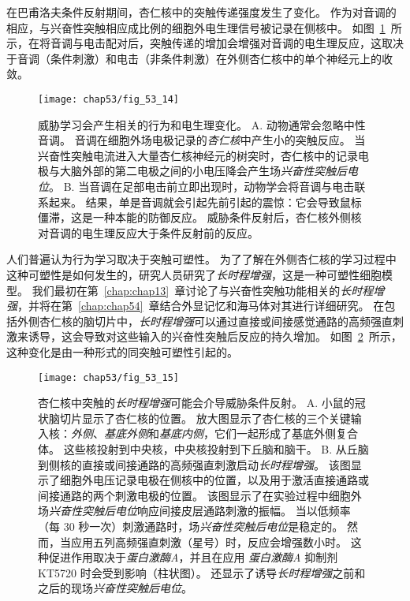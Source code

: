 在巴甫洛夫条件反射期间，杏仁核中的突触传递强度发生了变化。
作为对音调的相应，与兴奋性突触相应成比例的细胞外电生理信号被记录在侧核中。
如图~\ref{fig:53_14}~所示，在将音调与电击配对后，突触传递的增加会增强对音调的电生理反应，这取决于音调（条件刺激）和电击（非条件刺激）在外侧杏仁核中的单个神经元上的收敛。


\begin{figure}[htbp]
	\centering
	\texttt{[image: chap53/fig\_53\_14]}
	\caption{威胁学习会产生相关的行为和电生理变化。
		A. 动物通常会忽略中性音调。
		音调在细胞外场电极记录的\textit{杏仁核}中产生小的突触反应。 
		当兴奋性突触电流进入大量杏仁核神经元的树突时，杏仁核中的记录电极与大脑外部的第二电极之间的小电压降会产生场\textit{兴奋性突触后电位}。
		B. 当音调在足部电击前立即出现时，动物学会将音调与电击联系起来。
		结果，单是音调就会引起先前引起的震惊：它会导致鼠标僵滞，这是一种本能的防御反应。
		威胁条件反射后，杏仁核外侧核对音调的电生理反应大于条件反射前的反应\cite{rogan2005distinct}。}
	\label{fig:53_14}
\end{figure}


人们普遍认为行为学习取决于突触可塑性。
为了了解在外侧杏仁核的学习过程中这种可塑性是如何发生的，研究人员研究了\textit{长时程增强}，这是一种可塑性细胞模型。
我们最初在第~\ref{chap:chap13}~章讨论了与兴奋性突触功能相关的\textit{长时程增强}，并将在第~\ref{chap:chap54}~章结合外显记忆和海马体对其进行详细研究。
在包括外侧杏仁核的脑切片中，\textit{长时程增强}可以通过直接或间接感觉通路的高频强直刺激来诱导，这会导致对这些输入的兴奋性突触后反应的持久增加。
如图~\ref{fig:53_15}~所示，这种变化是由一种形式的同突触可塑性引起的。


\begin{figure}[htbp]
	\centering
	\texttt{[image: chap53/fig\_53\_15]}
	\caption{杏仁核中突触的\textit{长时程增强}可能会介导威胁条件反射。
		A. 小鼠的冠状脑切片显示了杏仁核的位置。
		放大图显示了杏仁核的三个关键输入核：\textit{外侧}、\textit{基底外侧}和\textit{基底内侧}，它们一起形成了基底外侧复合体。
		这些核投射到中央核，中央核投射到下丘脑和脑干\cite{maren1999long}。
		B. 从丘脑到侧核的直接或间接通路的高频强直刺激启动\textit{长时程增强}。
		该图显示了细胞外电压记录电极在侧核中的位置，以及用于激活直接通路或间接通路的两个刺激电极的位置。
		该图显示了在实验过程中细胞外场\textit{兴奋性突触后电位}响应间接皮层通路刺激的振幅。
		当以低频率（每 30 秒一次）刺激通路时，场\textit{兴奋性突触后电位}是稳定的。
		然而，当应用五列高频强直刺激（星号）时，反应会增强数小时。
		这种促进作用取决于\textit{蛋白激酶A}，并且在应用 \textit{蛋白激酶A} 抑制剂 KT5720 时会受到影响（柱状图）。 还显示了诱导\textit{长时程增强}之前和之后的现场\textit{兴奋性突触后电位}\cite{huang1998postsynaptic,huang2000both}。}
	\label{fig:53_15}
\end{figure}


